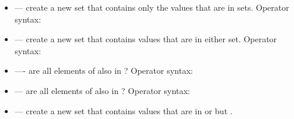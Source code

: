 \documentclass[letterpaper,10pt,english]{sphinxmanual}
\begin{document}
\begin{itemize}
\begin{itemize}
\begin{itemize}
\end{itemize}

%
\begin{sphinxVerbatim}[commandchars=\\\{\}]
  
\end{sphinxVerbatim}

\item {} 
 — create a new set that contains only the
values that are in  sets. Operator syntax:

%
\begin{sphinxVerbatim}[commandchars=\\\{\}]
  
\end{sphinxVerbatim}

\item {} 
 — create a new set that contains values that are
in either set. Operator syntax:

%
\begin{sphinxVerbatim}[commandchars=\\\{\}]
  
\end{sphinxVerbatim}

\item {} 
 —- are all elements of  also in ?
Operator syntax:

%
\begin{sphinxVerbatim}[commandchars=\\\{\}]
  
\end{sphinxVerbatim}

\item {} 
 — are all elements of  also in ?
Operator syntax:

%
\begin{sphinxVerbatim}[commandchars=\\\{\}]
  
\end{sphinxVerbatim}

\item {} 
 — create a new set that contains
values that are in  or  but .


\end{itemize}
\end{itemize}
\end{document}
